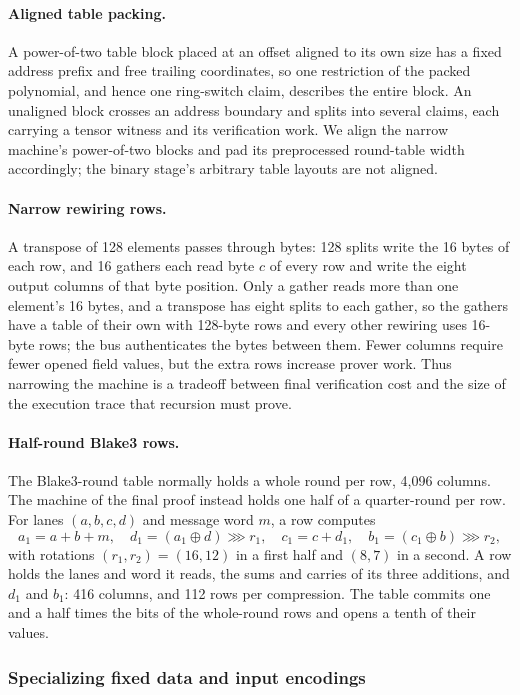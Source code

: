 \documentclass[11pt]{article}
\begin{document}
\paragraph{Aligned table packing.} A power-of-two table block placed at an
offset aligned to its own size has a fixed address prefix and free trailing
coordinates, so one restriction of the packed polynomial, and hence one
ring-switch claim, describes the entire block. An unaligned block crosses an
address boundary and splits into several claims, each carrying a tensor
witness and its verification work. We align the narrow machine's power-of-two
blocks and pad its preprocessed round-table width accordingly; the binary
stage's arbitrary table layouts are not aligned.

\paragraph{Narrow rewiring rows.} A transpose of 128 elements passes through
bytes: 128 splits write the 16 bytes of each row, and 16 gathers each read
byte $c$ of every row and write the eight output columns of that byte
position. Only a gather reads more than one element's 16 bytes, and a
transpose has eight splits to each gather, so the gathers have a table of
their own with 128-byte rows and every other rewiring uses 16-byte rows; the
bus authenticates the bytes between them. Fewer columns require fewer opened
field values, but the extra rows increase prover work. Thus narrowing the
machine is a tradeoff between final verification cost and the size of the
execution trace that recursion must prove.

\paragraph{Half-round Blake3 rows.} The Blake3-round table normally holds a
whole round per row, 4{,}096 columns. The machine of the final proof instead
holds one half of a quarter-round per row. For lanes $(a,b,c,d)$ and message
word $m$, a row computes
\[
  a_1=a+b+m,\quad d_1=(a_1\oplus d)\ggg r_1,\quad
  c_1=c+d_1,\quad b_1=(c_1\oplus b)\ggg r_2,
\]
with rotations $(r_1,r_2)=(16,12)$ in a first half and $(8,7)$ in a second.
A row holds the lanes and word it reads, the sums and carries of its three
additions, and $d_1$ and $b_1$: 416 columns, and 112 rows per compression.
The table commits one and a half times the bits of the whole-round rows and
opens a tenth of their values.

\subsubsection{Specializing fixed data and input encodings}
\end{document}
